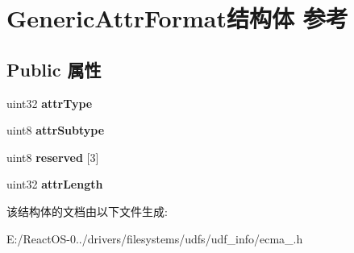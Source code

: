 \hypertarget{struct_generic_attr_format}{}\section{Generic\+Attr\+Format结构体 参考}
\label{struct_generic_attr_format}
\subsection*{Public 属性}
\begin{DoxyCompactItemize}
\item 
\mbox{\label{struct_generic_attr_format_ae784b7f92272fd0f73b5e4cbbe57b338}} 
uint32 {\bfseries attr\+Type}
\item 
\mbox{\label{struct_generic_attr_format_ad9a7a67a943ad0ca5206ff386454dee5}} 
uint8 {\bfseries attr\+Subtype}
\item 
\mbox{\label{struct_generic_attr_format_a8a24b309e5b8a360769bda8d59e6d2c9}} 
uint8 {\bfseries reserved} \mbox{[}3\mbox{]}
\item 
\mbox{\label{struct_generic_attr_format_a505c5cad1468697e145612cf764a85bc}} 
uint32 {\bfseries attr\+Length}
\end{DoxyCompactItemize}


该结构体的文档由以下文件生成\+:\begin{DoxyCompactItemize}
\item 
E\+:/\+React\+O\+S-\/0../drivers/filesystems/udfs/udf\+\_\+info/ecma\+\_.\+h\end{DoxyCompactItemize}
